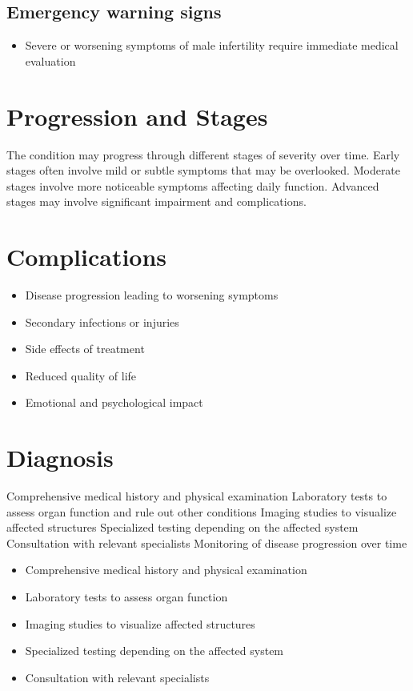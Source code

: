 \subsection{Emergency warning signs}
\begin{itemize}[noitemsep]
  \item Severe or worsening symptoms of male infertility require immediate medical evaluation
\end{itemize}
\section{Progression and Stages}
The condition may progress through different stages of severity over time. Early stages often involve mild or subtle symptoms that may be overlooked. Moderate stages involve more noticeable symptoms affecting daily function. Advanced stages may involve significant impairment and complications.
\section{Complications}
\begin{itemize}[noitemsep]
  \item Disease progression leading to worsening symptoms
  \item Secondary infections or injuries
  \item Side effects of treatment
  \item Reduced quality of life
  \item Emotional and psychological impact
\end{itemize}
\section{Diagnosis}
Comprehensive medical history and physical examination Laboratory tests to assess organ function and rule out other conditions Imaging studies to visualize affected structures Specialized testing depending on the affected system Consultation with relevant specialists Monitoring of disease progression over time

\begin{itemize}[noitemsep]
  \item Comprehensive medical history and physical examination
  \item Laboratory tests to assess organ function
  \item Imaging studies to visualize affected structures
  \item Specialized testing depending on the affected system
  \item Consultation with relevant specialists
\end{itemize}
